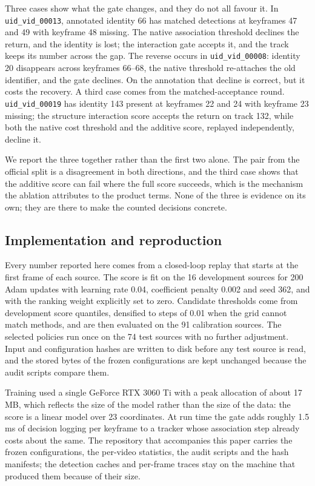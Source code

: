 Three cases show what the gate changes, and they do not all favour it. In
\texttt{uid\_vid\_00013}, annotated identity 66 has matched detections at
keyframes 47 and 49 with keyframe 48 missing. The native association
threshold declines the return, and the identity is lost; the interaction
gate accepts it, and the track keeps its number across the gap. The reverse
occurs in \texttt{uid\_vid\_00008}: identity 20 disappears across keyframes
66--68, the native threshold re-attaches the old identifier, and the gate
declines. On the annotation that decline is correct, but it costs the
recovery. A third case comes from the matched-acceptance round.
\texttt{uid\_vid\_00019} has identity 143 present at keyframes 22 and 24
with keyframe 23 missing; the structure interaction score accepts the
return on track 132, while both the native cost threshold and the additive
score, replayed independently, decline it.

We report the three together rather than the first two alone. The pair from
the official split is a disagreement in both directions, and the third case
shows that the additive score can fail where the full score succeeds, which
is the mechanism the ablation attributes to the product terms. None of the
three is evidence on its own; they are there to make the counted decisions
concrete.

\subsection{Implementation and reproduction}

Every number reported here comes from a closed-loop replay that starts at
the first frame of each source. The score is fit on the 16 development
sources for 200 Adam updates with learning rate 0.04, coefficient penalty
0.002 and seed 362, and with the ranking weight explicitly set to zero.
Candidate thresholds come from development score quantiles, densified to
steps of 0.01 when the grid cannot match methods, and are then evaluated on
the 91 calibration sources. The selected policies run once on the 74 test
sources with no further adjustment. Input and configuration hashes are
written to disk before any test source is read, and the stored bytes of the
frozen configurations are kept unchanged because the audit scripts compare
them.

Training used a single GeForce RTX 3060 Ti with a peak allocation of about
17 MB, which reflects the size of the model rather than the size of the
data: the score is a linear model over 23 coordinates. At run time the gate
adds roughly 1.5 ms of decision logging per keyframe to a tracker whose
association step already costs about the same. The repository that
accompanies this paper carries the frozen configurations, the per-video
statistics, the audit scripts and the hash manifests; the detection caches
and per-frame traces stay on the machine that produced them because of
their size.

